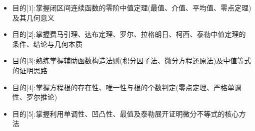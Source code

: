 \documentclass[11pt,a4paper,UTF8]{ctexart}
\begin{document}
\pagestyle{fancy}
\fancyhf{}
\fancyhead[R]{\small\color{TitlePurple}\nouppercase{\leftmark}}
\renewcommand{\headrulewidth}{0.5pt}

\tableofcontents
\newpage
{}


\begin{targetbox}[本章复习目标与核心知识图谱]
\begin{itemize}
  \item 目的[1]:掌握闭区间连续函数的零阶中值定理(最值、介值、平均值、零点定理)及其几何意义
\end{itemize}
\end{targetbox}

\begin{targetbox}[本章复习目标与核心知识图谱]
\begin{itemize}
  \item 目的[2]:掌握费马引理、达布定理、罗尔、拉格朗日、柯西、泰勒中值定理的条件、结论与几何本质
\end{itemize}
\end{targetbox}

\begin{targetbox}[本章复习目标与核心知识图谱]
\begin{itemize}
  \item 目的[3]:熟练掌握辅助函数构造法则(积分因子法、微分方程还原法)及中值等式的证明思路
\end{itemize}
\end{targetbox}

\begin{targetbox}[本章复习目标与核心知识图谱]
\begin{itemize}
  \item 目的[4]:掌握方程根的存在性、唯一性与根的个数判定(零点定理、严格单调性、罗尔推论)
\end{itemize}
\end{targetbox}

\begin{targetbox}[本章复习目标与核心知识图谱]
\begin{itemize}
  \item 目的[5]:掌握利用单调性、凹凸性、最值及泰勒展开证明微分不等式的核心方法
\end{itemize}
\end{targetbox}
\end{document}
